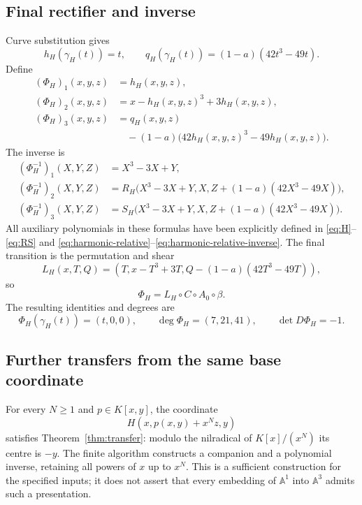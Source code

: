 \documentclass[11pt,a4paper]{article}
\newcommand{\A}{\mathbb A}
\newcommand{\comp}{\circ}
\begin{document}
\subsection{Final rectifier and inverse}

Curve substitution gives
\[
h_H(\gamma_H(t))=t,\qquad
q_H(\gamma_H(t))=(1-a)(42t^3-49t).
\]
Define
\begin{equation}\label{eq:PhiH}
\begin{aligned}
(\Phi_H)_1(x,y,z)&=h_H(x,y,z),\\
(\Phi_H)_2(x,y,z)&=x-h_H(x,y,z)^3+3h_H(x,y,z),\\
(\Phi_H)_3(x,y,z)&=q_H(x,y,z)\\
&\quad-(1-a)\bigl(42h_H(x,y,z)^3-49h_H(x,y,z)\bigr).
\end{aligned}
\end{equation}
The inverse is
\begin{equation}\label{eq:PhiHinv}
\begin{aligned}
(\Phi_H^{-1})_1(X,Y,Z)&=X^3-3X+Y,\\
(\Phi_H^{-1})_2(X,Y,Z)&=
R_H\bigl(X^3-3X+Y,X,Z+(1-a)(42X^3-49X)\bigr),\\
(\Phi_H^{-1})_3(X,Y,Z)&=
S_H\bigl(X^3-3X+Y,X,Z+(1-a)(42X^3-49X)\bigr).
\end{aligned}
\end{equation}
All auxiliary polynomials in these formulas have been explicitly defined
in \eqref{eq:H}--\eqref{eq:RS} and
\eqref{eq:harmonic-relative}--\eqref{eq:harmonic-relative-inverse}.
The final transition is the permutation and shear
\[
L_H(x,T,Q)=(T,x-T^3+3T,Q-(1-a)(42T^3-49T)),
\]
so
\[
\boxed{\Phi_H=L_H\comp C\comp A_0\comp\beta.}
\]
The resulting identities and degrees are
\begin{equation}\label{eq:harmonic-result}
\boxed{\Phi_H(\gamma_H(t))=(t,0,0),\qquad
\deg\Phi_H=(7,21,41),\qquad \det D\Phi_H=-1.}
\end{equation}

\clearpage


\clearpage
\subsection{Further transfers from the same base coordinate}

For every $N\ge1$ and $p\in K[x,y]$, the coordinate
\[
H(x,p(x,y)+x^N z,y)
\]
satisfies Theorem~\ref{thm:transfer}: modulo the nilradical of
$K[x]/(x^N)$ its centre is $-y$. The finite algorithm constructs a
companion and a polynomial inverse, retaining all powers of $x$ up to
$x^N$. This is a sufficient construction for the specified inputs; it
does not assert that every embedding of $\A^1$ into $\A^3$ admits such
a presentation.
\end{document}
